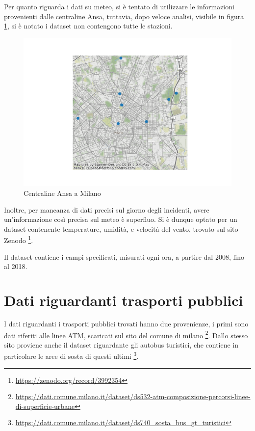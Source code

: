 \documentclass[a4paper]{report}
\begin{document}
Per quanto riguarda i dati su meteo, si è tentato di utilizzare le informazioni provenienti dalle 
centraline Ansa, tuttavia, dopo veloce analisi, visibile in figura \ref{fig:centraline-ansa}, 
si è notato i dataset non contengono tutte le stazioni.

\begin{figure}
    \includegraphics[width=\linewidth]{../src/meteo/centraline_ansa.png}
    \caption{Centraline Ansa a Milano}
    \label{fig:centraline-ansa}
\end{figure}


Inoltre, per mancanza di dati precisi sul giorno degli incidenti, avere un'informazione così 
precisa sul meteo è superfluo.
Si è dunque optato per un dataset contenente temperature, umidità, e velocità del vento, 
trovato sul sito Zenodo
\footnote{\url{https://zenodo.org/record/3992354}}.

Il dataset contiene i campi specificati, misurati ogni ora, a partire dal 2008, fino al 2018.

\section{Dati riguardanti trasporti pubblici}
I dati riguardanti i trasporti pubblici trovati hanno due provenienze, i primi sono 
dati riferiti alle linee ATM, scaricati sul sito del comune di milano
\footnote{\url{https://dati.comune.milano.it/dataset/ds532-atm-composizione-percorsi-linee-di-superficie-urbane}}.
Dallo stesso sito proviene anche il dataset riguardante gli autobus turistici, che 
contiene in particolare le aree di sosta di questi ultimi
\footnote{\url{https://dati.comune.milano.it/dataset/ds740_sosta_bus_gt_turistici}}.
\end{document}
